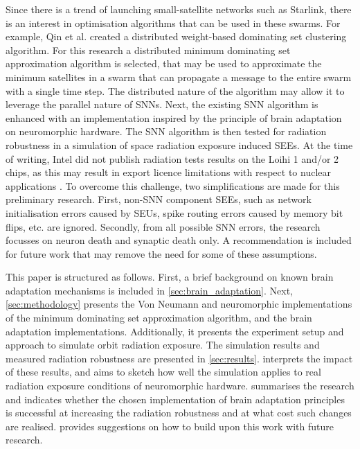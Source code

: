 Since there is a trend of launching small-satellite networks such as Starlink, there is an interest in optimisation algorithms that can be used in these swarms. For example, Qin et al. created a distributed weight-based dominating set clustering algorithm\cite{todo}.%
For this research a distributed minimum dominating set approximation algorithm is selected, that may be used to approximate the minimum satellites in a swarm that can propagate a message to the entire swarm with a single time step. The distributed nature of the algorithm may allow it to leverage the parallel nature of SNNs.
Next, the existing SNN algorithm is enhanced with an implementation inspired by the principle of brain adaptation on neuromorphic hardware. The SNN algorithm is then tested for radiation robustness in a simulation of space radiation exposure induced SEEs. At the time of writing, Intel did not publish radiation tests results on the Loihi 1 and/or 2 chips, as this may result in export licence limitations with respect to nuclear applications \cite{inrc_meeting}. To overcome this challenge, two simplifications are made for this preliminary research. First, non-SNN component SEEs, such as network initialisation errors caused by SEUs, spike routing errors caused by memory bit flips, etc. are ignored. Secondly, from all possible SNN errors, the research focusses on neuron death and synaptic death only. A recommendation is included for future work that may remove the need for some of these assumptions. %

This paper is structured as follows. First, a brief background on known brain adaptation mechanisms is included in \cref{sec:brain_adaptation}. Next, \cref{sec:methodology} presents the Von Neumann and neuromorphic implementations of the minimum dominating set approximation algorithm, and the brain adaptation implementations. Additionally, it presents the experiment setup and approach to simulate orbit radiation exposure. The simulation results and measured radiation robustness are presented in \cref{sec:results}.  interprets the impact of these results, and aims to sketch how well the simulation applies to real radiation exposure conditions of neuromorphic hardware.  summarises the research and indicates whether the chosen implementation of brain adaptation principles is successful at increasing the radiation robustness and at what cost such changes are realised.  provides suggestions on how to build upon this work with future research. %